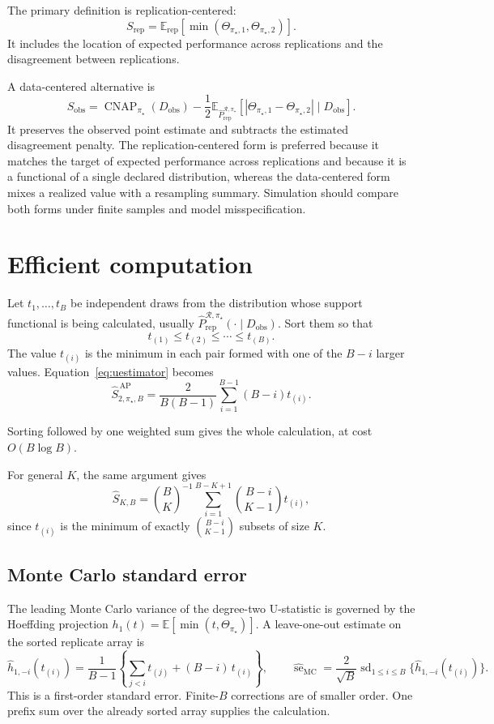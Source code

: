 \documentclass[11pt]{article}
\newcommand{\CNAP}{\operatorname{CNAP}}
\newcommand{\Regime}{\mathcal{R}}
\newcommand{\Tpi}{\CNAP_{\pi_\star}}
\newcommand{\E}{\mathbb{E}}
\newcommand{\SAPHatB}{\widehat S_{2,\pi_\star,B}^{\,\mathrm{AP}}}
\newcommand{\PRepHat}{\widehat{P}_{\mathrm{rep}}^{\Regime,\pi_\star}}
\theoremstyle{remark}
\begin{document}
The primary definition is replication-centered:
\[
S_{\mathrm{rep}}
=
\E_{\mathrm{rep}}
\left[
\min(\Theta_{\pi_\star,1},\Theta_{\pi_\star,2})
\right].
\]
It includes the location of expected performance across replications and the disagreement between replications.

A data-centered alternative is
\[
S_{\mathrm{obs}}
=
\Tpi(D_{\mathrm{obs}})
-
\frac12
\E_{\PRepHat}
\left[
|\Theta_{\pi_\star,1}-\Theta_{\pi_\star,2}|
\mid D_{\mathrm{obs}}
\right].
\]
It preserves the observed point estimate and subtracts the estimated disagreement penalty. The replication-centered form is preferred because it matches the target of expected performance across replications and because it is a functional of a single declared distribution, whereas the data-centered form mixes a realized value with a resampling summary. Simulation should compare both forms under finite samples and model misspecification.

\section{Efficient computation}
\label{app:computation}

Let $t_1,\ldots,t_B$ be independent draws from the distribution whose support functional is being calculated, usually $\PRepHat(\cdot\mid D_{\mathrm{obs}})$. Sort them so that
\[
t_{(1)}\leq t_{(2)}\leq\cdots\leq t_{(B)}.
\]
The value $t_{(i)}$ is the minimum in each pair formed with one of the $B-i$ larger values. Equation~\eqref{eq:uestimator} becomes
\begin{equation}
\SAPHatB
=
\frac{2}{B(B-1)}
\sum_{i=1}^{B-1}(B-i)t_{(i)}.
\label{eq:sorted}
\end{equation}

Sorting followed by one weighted sum gives the whole calculation, at cost $O(B\log B)$.

For general $K$, the same argument gives
\[
\widehat S_{K,B}
=
\binom{B}{K}^{-1}
\sum_{i=1}^{B-K+1}
\binom{B-i}{K-1}
t_{(i)},
\]
since $t_{(i)}$ is the minimum of exactly $\binom{B-i}{K-1}$ subsets of size $K$.

\subsection{Monte Carlo standard error}
\label{app:mcse}

The leading Monte Carlo variance of the degree-two U-statistic is governed by the Hoeffding projection $h_1(t)=\E[\min(t,\Theta_{\pi_\star})]$. A leave-one-out estimate on the sorted replicate array is
\begin{equation}
\widehat h_{1,-i}(t_{(i)})
=
\frac{1}{B-1}
\left\{
\sum_{j<i}t_{(j)}
+
(B-i)\,t_{(i)}
\right\},
\qquad
\widehat{\operatorname{se}}_{\mathrm{MC}}
=
\frac{2}{\sqrt{B}}
\operatorname{sd}_{1\leq i\leq B}
\{\widehat h_{1,-i}(t_{(i)})\}.
\label{eq:mcse}
\end{equation}
This is a first-order standard error. Finite-$B$ corrections are of smaller order. One prefix sum over the already sorted array supplies the calculation.
\end{document}
